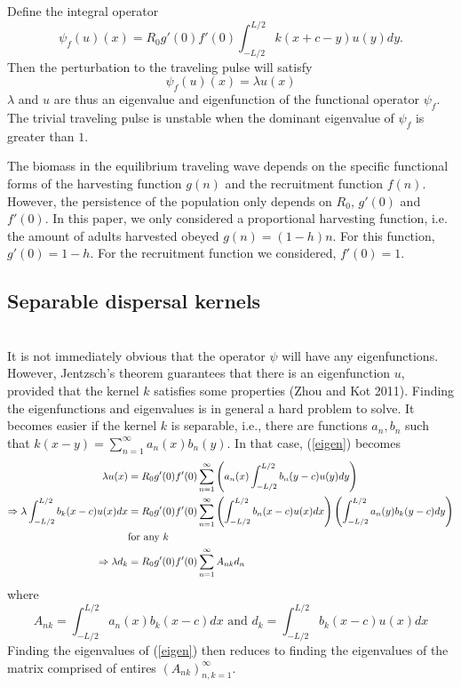 \documentclass[12pt,english]{article}
\begin{document}
Define the integral operator
$$ \psi_f(u)(x)=R_0g'(0)f'(0)\int_{-L/2}^{L/2}k(x+c-y)u(y)dy. $$
Then the perturbation to the traveling pulse will satisfy 
\begin{equation} \psi_f(u)(x)=\lambda u(x) \label{eigen} \end{equation}
$\lambda$ and $u$ are thus an eigenvalue and eigenfunction of the functional operator $\psi_f$.  The trivial traveling pulse is unstable when the dominant eigenvalue of $\psi_f$ is greater than $1$.


The biomass in the equilibrium traveling wave depends on the specific functional forms of the harvesting function $g(n)$ and the recruitment function $f(n)$.  However, the persistence of the population only depends on $R_0$, $g'(0)$ and $f'(0)$. In this paper, we only considered a proportional harvesting function, i.e. the amount of adults harvested obeyed $g(n)=(1-h)n$.  For this function, $g'(0)=1-h$.  For the recruitment function we considered, $f'(0)=1$.

\subsection{Separable dispersal kernels \label{sep}}
~\\It is not immediately obvious that the operator $\psi$ will have any eigenfunctions.  However, Jentzsch's theorem guarantees that there is an eigenfunction $u$, provided that the kernel $k$ satisfies some properties (Zhou and Kot 2011).  Finding the eigenfunctions and eigenvalues is in general a hard problem to solve.  It becomes easier if the kernel $k$ is separable, i.e., there are functions $a_n,b_n$ such that $k(x-y)=\sum_{n=1}^\infty a_n(x)b_n(y)$.  In that case, (\ref{eigen}) becomes
\begin{align}
\lambda u(x)&=R_0g'(0)f'(0)\sum_{n=1}^\infty\left( a_n(x)\int_{-L/2}^{L/2}b_n(y-c)u(y)dy\right) \notag
\\ \Rightarrow \lambda\int_{-L/2}^{L/2}b_k(x-c)u(x)dx&=R_0g'(0)f'(0)\sum_{n=1}^{\infty}\left(\int_{-L/2}^{L/2}b_n(x-c)u(x)dx\right)\left(\int_{-L/2}^{L/2}a_n(y)b_k(y-c)dy\right) \notag
\\& \text{for any $k$} \notag
\\ \Rightarrow \lambda d_k&=R_0g'(0)f'(0)\sum_{n=1}^\infty A_{nk}d_n  \label{problem}
\end{align}
where
\begin{equation*}
A_{nk}=\int_{-L/2}^{L/2}a_n(x)b_k(x-c)dx \text{ and } d_k=\int_{-L/2}^{L/2}b_k(x-c)u(x)dx
\end{equation*}
Finding the eigenvalues of (\ref{eigen}) then reduces to finding the eigenvalues of the matrix comprised of entires $(A_{nk})_{n,k=1}^\infty$.
\end{document}
